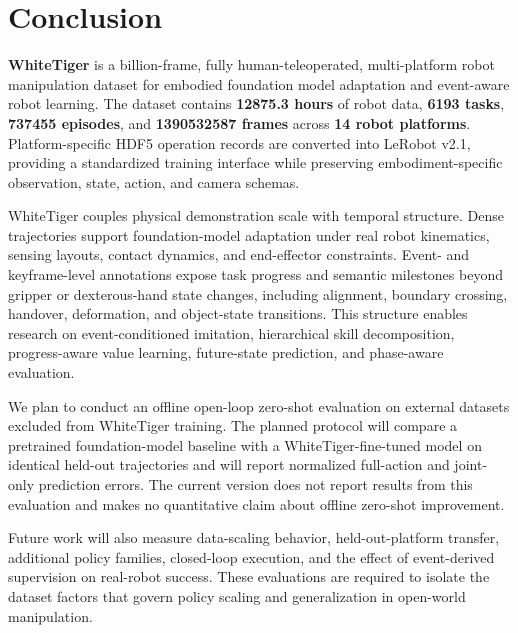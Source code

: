 \section{Conclusion}

\textbf{WhiteTiger} is a billion-frame, fully human-teleoperated, multi-platform robot manipulation dataset for embodied foundation model adaptation and event-aware robot learning. The dataset contains \textbf{12875.3 hours} of robot data, \textbf{6193 tasks}, \textbf{737455 episodes}, and \textbf{1390532587 frames} across \textbf{14 robot platforms}. Platform-specific HDF5 operation records are converted into LeRobot v2.1, providing a standardized training interface while preserving embodiment-specific observation, state, action, and camera schemas.

WhiteTiger couples physical demonstration scale with temporal structure. Dense trajectories support foundation-model adaptation under real robot kinematics, sensing layouts, contact dynamics, and end-effector constraints. Event- and keyframe-level annotations expose task progress and semantic milestones beyond gripper or dexterous-hand state changes, including alignment, boundary crossing, handover, deformation, and object-state transitions. This structure enables research on event-conditioned imitation, hierarchical skill decomposition, progress-aware value learning, future-state prediction, and phase-aware evaluation.

We plan to conduct an offline open-loop zero-shot evaluation on external datasets excluded from WhiteTiger training. The planned protocol will compare a pretrained foundation-model baseline with a WhiteTiger-fine-tuned model on identical held-out trajectories and will report normalized full-action and joint-only prediction errors. The current version does not report results from this evaluation and makes no quantitative claim about offline zero-shot improvement.

Future work will also measure data-scaling behavior, held-out-platform transfer, additional policy families, closed-loop execution, and the effect of event-derived supervision on real-robot success. These evaluations are required to isolate the dataset factors that govern policy scaling and generalization in open-world manipulation.
